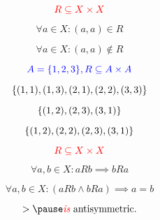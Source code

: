 
\begin{frame}{}
  \begin{center}
  \end{center}
\end{frame}

\begin{frame}{}
  \[
    \textcolor{red}{R \subseteq X \times X}
  \]

  \begin{definition}[Reflexive]
    \[
      \forall a \in X: (a, a) \in R
    \]

  \end{definition}

  \pause
  \vspace{0.30cm}
  \begin{definition}[Irreflexive]
    \[
      \forall a \in X: (a, a) \notin R
    \]
  \end{definition}
\end{frame}

\begin{frame}{}
  \[
    \textcolor{blue}{A = \{1, 2, 3\}, R \subseteq A \times A}
  \]

  \[
    \{(1, 1), (1, 3), (2, 1), (2, 2), (3, 3)\}
  \]

  \pause
  \[
    \{(1, 2), (2, 3), (3, 1)\}
  \]

  \pause
  \[
    \{(1, 2), (2, 2), (2, 3), (3, 1)\}
  \]
\end{frame}

\begin{frame}{}
  \[
    \textcolor{red}{R \subseteq X \times X}
  \]

  \begin{definition}[Symmetric]
    \[
      \forall a, b \in X: a R b \implies b R a
    \]

  \end{definition}

  \pause
  \begin{definition}[AntiSymmetric]
    \[
      \forall a, b \in X: (a R b \land b R a) \implies a = b
    \]
  \end{definition}

  \pause
  \[
    > \pause \text{\red{\it is} antisymmetric}.
  \]
\end{frame}

